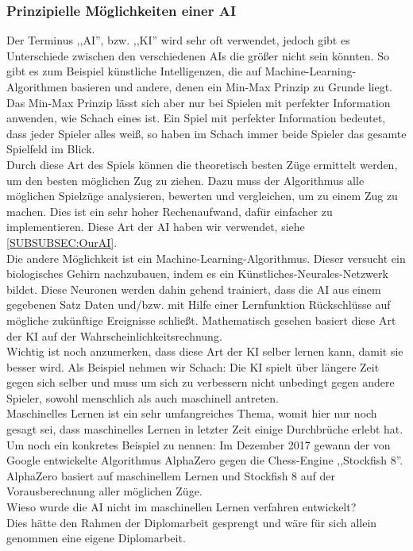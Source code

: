 \documentclass[12pt,a4paper]{article}
\begin{document}
{\subsubsection{Prinzipielle Möglichkeiten einer AI}
\label{SUBSUBSEC:GenAI}

Der Terminus ,,AI'', bzw. ,,KI'' wird sehr oft verwendet, jedoch gibt es Unterschiede zwischen den verschiedenen AIs die größer nicht sein könnten. So gibt es zum Beispiel künstliche Intelligenzen, die auf Machine-Learning-Algorithmen basieren und andere, denen ein Min-Max Prinzip zu Grunde liegt. \\
Das Min-Max Prinzip lässt sich aber nur bei Spielen mit perfekter Information anwenden, wie Schach eines ist. Ein Spiel mit perfekter Information bedeutet, dass jeder Spieler alles weiß, so haben im Schach immer beide Spieler das gesamte Spielfeld im Blick. \\[2ex]
Durch diese Art des Spiels können die theoretisch besten Züge ermittelt werden, um den besten möglichen Zug zu ziehen. Dazu muss der Algorithmus alle möglichen Spielzüge analysieren, bewerten und vergleichen, um zu einem Zug zu machen. Dies ist ein sehr hoher Rechenaufwand, dafür einfacher zu implementieren. Diese Art der AI haben wir verwendet, siehe \ref{SUBSUBSEC:OurAI}. \\[3ex]
Die andere Möglichkeit ist ein Machine-Learning-Algorithmus. Dieser versucht ein biologisches Gehirn nachzubauen, indem es ein Künstliches-Neurales-Netzwerk bildet. Diese Neuronen werden dahin gehend trainiert, dass die AI aus einem gegebenen Satz Daten und/bzw. mit Hilfe einer Lernfunktion Rückschlüsse auf mögliche zukünftige Ereignisse schließt. Mathematisch gesehen basiert diese Art der KI auf der Wahrscheinlichkeitsrechnung.  \\
Wichtig ist noch anzumerken, dass diese Art der KI selber lernen kann, damit sie besser wird. Als Beispiel nehmen wir Schach: Die KI spielt über längere Zeit gegen sich selber und muss um sich zu verbessern nicht unbedingt gegen andere Spieler, sowohl menschlich als auch maschinell antreten. \\
Maschinelles Lernen ist ein sehr umfangreiches Thema, womit hier nur noch gesagt sei, dass maschinelles Lernen in letzter Zeit einige Durchbrüche erlebt hat. Um noch ein konkretes Beispiel zu nennen: Im Dezember 2017 gewann der von Google entwickelte Algorithmus AlphaZero gegen die Chess-Engine ,,Stockfish 8''. AlphaZero basiert auf maschinellem Lernen und Stockfish 8 auf der Vorausberechnung aller möglichen Züge.\cite{SkyNet} \\[2ex]
Wieso wurde die AI nicht im maschinellen Lernen verfahren entwickelt? \\
Dies hätte den Rahmen der Diplomarbeit gesprengt und wäre für sich allein genommen eine eigene Diplomarbeit.

}
\end{document}
